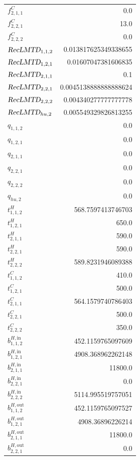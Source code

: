 \documentclass{article}%
\begin{document}
\begin{multicols*}{3}
\begin{supertabular}{lr}
	$f_{2,1,1}^{C}$ & 0.0 \\%
	$f_{2,2,1}^{C}$ & 13.0 \\%
	$f_{2,2,2}^{C}$ & 0.0 \\%
	$\textsl{RecLMTD}_{1,1,2}$ & 0.013817625349338655 \\%
	$\textsl{RecLMTD}_{1,2,1}$ & 0.01607047381606835 \\%
	$\textsl{RecLMTD}_{2,1,1}$ & 0.1 \\%
	$\textsl{RecLMTD}_{2,2,1}$ & 0.0045138888888888624 \\%
	$\textsl{RecLMTD}_{2,2,2}$ & 0.004340277777777778 \\%
	$\textsl{RecLMTD}_{hu,2}$ & 0.005549329826813255 \\%
	$q_{1,1,2}$ & 0.0 \\%
	$q_{1,2,1}$ & 0.0 \\%
	$q_{2,1,1}$ & 0.0 \\%
	$q_{2,2,1}$ & 0.0 \\%
	$q_{2,2,2}$ & 0.0 \\%
	$q_{hu,2}$ & 0.0 \\%
	$t_{1,1,2}^{H}$ & 568.7597413746703 \\%
	$t_{1,2,1}^{H}$ & 650.0 \\%
	$t_{2,1,1}^{H}$ & 590.0 \\%
	$t_{2,2,1}^{H}$ & 590.0 \\%
	$t_{2,2,2}^{H}$ & 589.8231946089388 \\%
	$t_{1,1,2}^{C}$ & 410.0 \\%
	$t_{1,2,1}^{C}$ & 500.0 \\%
	$t_{2,1,1}^{C}$ & 564.1579740786403 \\%
	$t_{2,2,1}^{C}$ & 500.0 \\%
	$t_{2,2,2}^{C}$ & 350.0 \\%
	$b_{1,1,2}^{H,\text{in}}$ & 452.1159765097609 \\%
	$b_{1,2,1}^{H,\text{in}}$ & 4908.368962262148 \\%
	$b_{2,1,1}^{H,\text{in}}$ & 11800.0 \\%
	$b_{2,2,1}^{H,\text{in}}$ & 0.0 \\%
	$b_{2,2,2}^{H,\text{in}}$ & 5114.995519757051 \\%
	$b_{1,1,2}^{H,\text{out}}$ & 452.1159765097527 \\%
	$b_{1,2,1}^{H,\text{out}}$ & 4908.36896226214 \\%
	$b_{2,1,1}^{H,\text{out}}$ & 11800.0 \\%
	$b_{2,2,1}^{H,\text{out}}$ & 0.0 \\%

\end{supertabular}
\end{multicols*}
\end{document}
